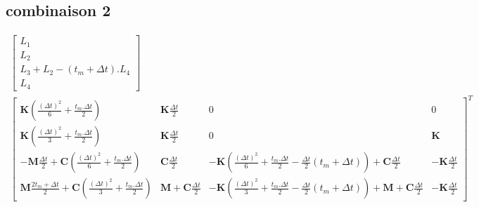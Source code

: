 \documentclass[12pt,a4paper]{report}
\begin{document}
\subsection{combinaison 2}
\begin{equation}
\!\!\!\!\!\!\!\!\!\!\!\!\!\!\!\!\!\!\!\!\!\!\!\!\!\!\!\!\!\!
\begin{array}{c}
	\begin{bmatrix}	
		  L_1
		\\L_2
		\\ L_3 + L_2 - (t_m+\Delta t).L_4
		\\L_4
	\end{bmatrix}
	\\
		\begin{bmatrix}	   
			   \mathbf{K}
				   \left( \frac{(\Delta t)^2}{6} + \frac{t_m.\Delta t}{2}
				   \right)
			&
		   		\mathbf{K} \frac{\Delta t}{2}
		   	&   
		   		0
			&
		   		0
		\\   
			   \mathbf{K}
				   \left( \frac{(\Delta t)^2}{3} + \frac{t_m.\Delta t}{2}
				   \right)
			&
		   		\mathbf{K} \frac{\Delta t}{2} 
		   	&
		   		0
			&
		   		\mathbf{K}
		\\   
			   -\mathbf{M}
			   		\frac{\Delta t}{2} 
			   +\mathbf{C}
			   		\left( \frac{(\Delta t)^2}{6} 
			   				+ \frac{t_m.\Delta t}{2} \right)  
		   	& 
		   		\mathbf{C} \frac{\Delta t}{2}
		   	&
			   	-\mathbf{K}
			   		(\frac{(\Delta t)^2}{6} 
			   			+ \frac{t_m.\Delta t}{2}
			   			-\frac{\Delta t}{2}(t_m + \Delta t))
		   		+\mathbf{C} \frac{\Delta t}{2}
		   	&
		   		-\mathbf{K} \frac{\Delta t}{2}
		\\   
			   \mathbf{M}
			   		\frac{2t_m + \Delta t}{2} 
			   +\mathbf{C}
			   		\left( \frac{(\Delta t)^2}{3} 
			   				+ \frac{t_m.\Delta t}{2}\right)
		   	&
			   \mathbf{M} 
			   +\mathbf{C} \frac{\Delta t}{2}
		   	&
		   		-\mathbf{K} (\frac{(\Delta t)^2}{3} 
		   						+ \frac{t_m.\Delta t}{2}
		   						-\frac{\Delta t}{2}(t_m + \Delta t))
		   		+\mathbf{M} 
			   	+\mathbf{C} \frac{\Delta t}{2}
		   	&
		   		-\mathbf{K} \frac{\Delta t}{2}
	\end{bmatrix}^T
\end{array}
\end{equation}
\end{document}
